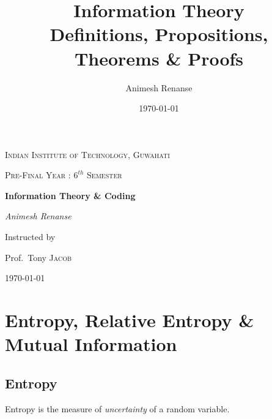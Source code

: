 \documentclass{article}
\title{Information Theory\\
	\large Definitions, Propositions, Theorems \& Proofs}
\author{Animesh Renanse}
\date{\today}
\theoremstyle{definition}
\theoremstyle{remark}
\theoremstyle{definition}
\theoremstyle{definition}
\theoremstyle{definition}
\begin{document}
	\begin{titlepage}
		{\scshape\LARGE Indian Institute of Technology, Guwahati \par}
		\vspace{1cm}
		{\scshape\Large Pre-Final Year : $ 6^{th} $ Semester\par}
		\vspace{1.5cm}
		{\Huge\bfseries Information Theory \& Coding\par}
		\vspace{2cm}
		{\Large\itshape Animesh Renanse\par}
		\vfill
		Instructed by\par
		Prof.~Tony \textsc{Jacob}
		
		\vfill
		
		{\large \today\par}
	\end{titlepage}
	\newpage
	\pagestyle{empty}
	\tableofcontents
	\newpage
\section{Entropy, Relative Entropy \& Mutual Information}
\subsection{Entropy}
Entropy is the measure of \textit{uncertainty} of a random variable.
\end{document}
